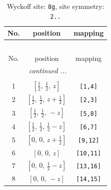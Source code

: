 \documentclass[fleqn,8pt]{jsarticle}
\begin{document}
\renewcommand{\arraystretch}{1.2}
\begin{longtable}{ccc}
\caption{Wyckoff site: {\tt 8g}, site symmetry: {\tt 2..}}
 \\
 \hline \hline
No. & position & mapping \\ \hline \endfirsthead

\multicolumn{2}{l}{\tablename\ \thetable{}} \\
 \hline \hline
No. & position & mapping \\ \hline \endhead

 \hline \hline
\multicolumn{2}{r}{\footnotesize\it continued ...} \\ \endfoot

 \hline \hline
\multicolumn{2}{r}{} \\ \endlastfoot

1 & $\left[ \frac{1}{2},\, \frac{1}{2},\, z \right]$ & {\tt [1,4]} \\ \hline
2 & $\left[ \frac{1}{2},\, \frac{1}{2},\, z + \frac{1}{2} \right]$ & {\tt [2,3]} \\ \hline
3 & $\left[ \frac{1}{2},\, \frac{1}{2},\, - z \right]$ & {\tt [5,8]} \\ \hline
4 & $\left[ \frac{1}{2},\, \frac{1}{2},\, \frac{1}{2} - z \right]$ & {\tt [6,7]} \\ \hline
5 & $\left[ 0,\, 0,\, z + \frac{1}{2} \right]$ & {\tt [9,12]} \\ \hline
6 & $\left[ 0,\, 0,\, z \right]$ & {\tt [10,11]} \\ \hline
7 & $\left[ 0,\, 0,\, \frac{1}{2} - z \right]$ & {\tt [13,16]} \\ \hline
8 & $\left[ 0,\, 0,\, - z \right]$ & {\tt [14,15]} \\
\end{longtable}
\renewcommand{\arraystretch}{1.2}
\end{document}
